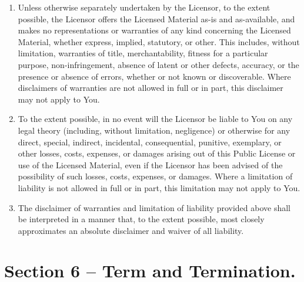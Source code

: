 \begin{enumerate}[label=\alph*.]
  \item Unless otherwise separately undertaken by the Licensor, to the extent possible, the Licensor offers the Licensed Material as-is and as-available, and makes no representations or warranties of any kind concerning the Licensed Material, whether express, implied, statutory, or other. This includes, without limitation, warranties of title, merchantability, fitness for a particular purpose, non-infringement, absence of latent or other defects, accuracy, or the presence or absence of errors, whether or not known or discoverable. Where disclaimers of warranties are not allowed in full or in part, this disclaimer may not apply to You.

  \item To the extent possible, in no event will the Licensor be liable to You on any legal theory (including, without limitation, negligence) or otherwise for any direct, special, indirect, incidental, consequential, punitive, exemplary, or other losses, costs, expenses, or damages arising out of this Public License or use of the Licensed Material, even if the Licensor has been advised of the possibility of such losses, costs, expenses, or damages. Where a limitation of liability is not allowed in full or in part, this limitation may not apply to You.

  \item The disclaimer of warranties and limitation of liability provided above shall be interpreted in a manner that, to the extent possible, most closely approximates an absolute disclaimer and waiver of all liability.
\end{enumerate}

\section{Section 6 – Term and Termination.}
\label{section6}

